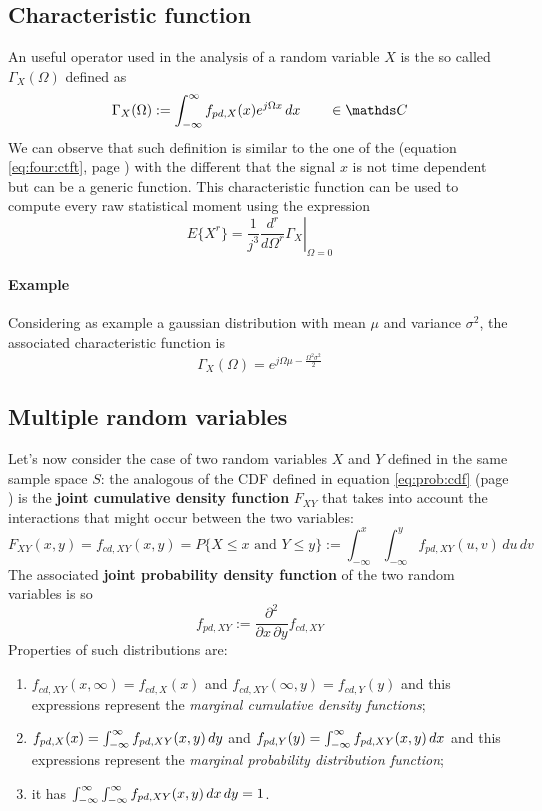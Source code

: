 	\subsection{Characteristic function}
		An useful operator used in the analysis of a random variable $X$ is the so called  $\Gamma_X(\Omega)$ defined as
		\begin{equation}
			\Gamma_X(\Omega) := \intinf f_{pd,X}(x) e^{j\Omega x}\, dx \qquad \in \mathds C
		\end{equation}
		We can observe that such definition is similar to the one of the \ctft (equation \ref{eq:four:ctft}, page \pageref{eq:four:ctft}) with the different that the signal $x$ is not time dependent but can be a generic function. This characteristic function can be used to compute every raw statistical moment using the expression
		\begin{equation}
			E\big\{ X^r \big\} = \frac{1}{j^3}  \left. \frac{d^r}{d\Omega^r} \Gamma_X \right|_{\Omega= 0}
		\end{equation}
		
		\paragraph{Example} Considering as example a gaussian distribution with mean $\mu$ and variance $\sigma^2$, the associated characteristic function is
		\[ \Gamma_X(\Omega) = e^{j\Omega \mu - \frac{\Omega^2\sigma^2}{2}} \]
	
	\subsection{Multiple random variables}
		Let's now consider the case of two random variables $X$ and $Y$ defined in the same sample space $S$: the analogous of the CDF defined in equation \ref{eq:prob:cdf} (page \pageref{eq:prob:cdf}) is the \textbf{joint cumulative density function} $F_{XY}$ that takes into account the interactions that might occur between the two variables:
		\begin{equation}
			F_{XY} (x,y) = f_{cd,XY} (x,y) = P\big\{ X\leq x \textrm{ and } Y \leq y \big\} := \int_{-\infty}^x \int_{-\infty}^y f_{pd,XY}(u,v)\, du\, dv
		\end{equation}
		The associated \textbf{joint probability density function} of the two random variables is so
		\begin{equation}
			f_{pd,XY} := \frac{\partial^2}{\partial x\, \partial y} f_{cd,XY}
		\end{equation}
		Properties of such distributions are:
		\begin{enumerate}[\itshape i)]
			\item $f_{cd,XY} (x,\infty) = f_{cd,X}(x)$ and $f_{cd,XY} (\infty,y) = f_{cd,Y}(y)$ and this expressions represent the \textit{marginal cumulative density functions};
			\item $f_{pd,X}(x) = \int_{-\infty}^\infty f_{pd,XY}(x,y)\, dy$ and $f_{pd,Y}(y) = \int_{-\infty}^\infty f_{pd,XY}(x,y)\, dx$ and this expressions represent the \textit{marginal probability distribution function};
			\item it has $\int_{-\infty}^\infty \int_{-\infty}^\infty f_{pd,XY}(x,y)\,dx\,dy = 1$.			
		\end{enumerate}
	
